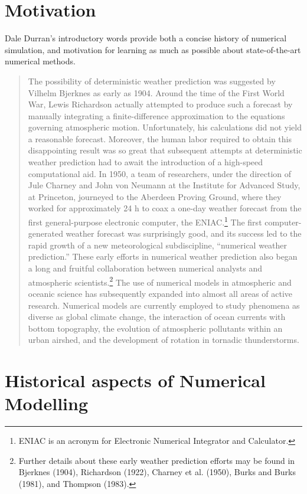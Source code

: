 \documentclass[11pt,fleqn]{book} %
\begin{document}
	\section{Motivation}
	
	Dale Durran's introductory words provide both a concise history of numerical simulation, and motivation for learning as much as possible about state-of-the-art numerical methods.
	
	\begin{quotation}
	The possibility of deterministic weather prediction was suggested by Vilhelm Bjerknes as early as 1904. Around the time of the First World War, Lewis Richardson actually attempted to produce such a forecast by manually integrating a finite-difference approximation to the equations governing atmospheric motion. Unfortunately, his calculations did not yield a reasonable forecast. Moreover, the human labor required to obtain this disappointing result was so great that subsequent attempts at deterministic weather prediction had to await the introduction of a high-speed computational aid. In 1950, a team of researchers, under the direction of Jule Charney and John von Neumann at the Institute for Advanced Study, at Princeton, journeyed to the Aberdeen Proving Ground, where they worked for approximately 24 h to coax a one-day weather forecast from the first general-purpose electronic computer, the ENIAC.\footnote{ENIAC is an acronym for Electronic Numerical Integrator and Calculator.} The first computer-generated weather forecast was surprisingly good, and its success led to the rapid growth of a new meteorological subdiscipline, “numerical weather prediction.” These early efforts in numerical weather prediction also began a long and fruitful collaboration between numerical analysts and atmospheric scientists.\footnote{Further details about these early weather prediction efforts may be found in Bjerknes (1904), Richardson (1922), Charney et al. (1950), Burks and Burks (1981), and Thompson (1983).} The use of numerical models in atmospheric and oceanic science has subsequently expanded into almost all areas of active research. Numerical models are currently employed to study phenomena as diverse as global climate change, the interaction of ocean currents with bottom topography, the evolution of atmospheric pollutants within an urban airshed, and the development of rotation in tornadic thunderstorms.
	\end{quotation}

	\section{Historical aspects of Numerical Modelling}
	
\end{document}
